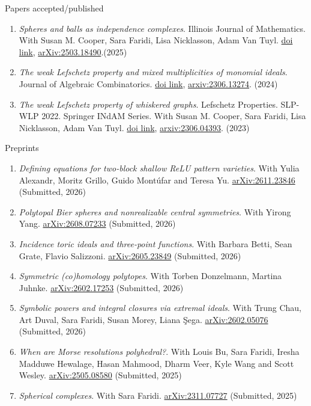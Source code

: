 \documentclass[12pt]{resume} %
\begin{document}
\begin{rSection}{Papers accepted/published}
\begin{enumerate}
        \item \textit{Spheres and balls as independence complexes}. Illinois Journal of Mathematics. With Susan M. Cooper, Sara Faridi, Lisa Nicklasson, Adam Van Tuyl. \href{https://doi.org/10.1215/00192082-12469402}{doi link}, \href{https://arxiv.org/abs/2503.18490}{arXiv:2503.18490}.(2025)
        \item \textit{The weak Lefschetz property and mixed multiplicities of monomial ideals}. Journal of Algebraic Combinatorics. \href{https://doi.org/10.1007/s10801-024-01337-8}{doi link}, \href{https://arxiv.org/abs/2306.13274}{arxiv:2306.13274}. (2024)
        \item \textit{The weak Lefschetz property of whiskered graphs}.  Lefschetz Properties. SLP-WLP 2022. Springer INdAM Series. With Susan M. Cooper, Sara Faridi, Lisa Nicklasson, Adam Van Tuyl. \href{https://doi.org/10.1007/978-981-97-3886-1_5}{doi link}, \href{https://arxiv.org/abs/2306.04393}{arxiv:2306.04393}. (2023)
    \end{enumerate}
\end{rSection}
\begin{rSection}{Preprints}

\begin{enumerate}
    \item \textit{Defining equations for two-block shallow ReLU pattern varieties}. With Yulia Alexandr, Moritz Grillo, Guido Mont\'ufar and Teresa Yu. \href{https://arxiv.org/abs/2611.23846}{arXiv:2611.23846} (Submitted, 2026) 
    \item \textit{Polytopal Bier spheres and nonrealizable central symmetries}. With Yirong Yang. \href{https://arxiv.org/abs/2608.07233}{arXiv:2608.07233} (Submitted, 2026) 
    \item \textit{Incidence toric ideals and three-point functions}. With Barbara Betti, Sean Grate, Flavio Salizzoni. \href{https://arxiv.org/abs/2605.23849}{arXiv:2605.23849} (Submitted, 2026) 
    \item \textit{Symmetric (co)homology polytopes}. With Torben Donzelmann, Martina Juhnke. \href{https://arxiv.org/abs/2602.17253}{arXiv:2602.17253} (Submitted, 2026) 
    \item \textit{Symbolic powers and integral closures via extremal ideals}. With Trung Chau, Art Duval, Sara Faridi, Susan Morey, Liana \c{S}ega. \href{https://arxiv.org/abs/2602.05076}{arXiv:2602.05076} (Submitted, 2026) 
    \item \textit{When are Morse resolutions polyhedral?}.  With Louis Bu, Sara Faridi, Iresha Madduwe Hewalage, Hasan Mahmood, Dharm Veer, Kyle Wang and Scott Wesley. \href{https://arxiv.org/abs/2505.08580}{arXiv:2505.08580} (Submitted, 2025) 
    \item \textit{Spherical complexes}. With Sara Faridi. \href{https://arxiv.org/abs/2311.07727}{arXiv:2311.07727} (Submitted, 2025)
\end{enumerate}
\end{rSection}
\end{document}
